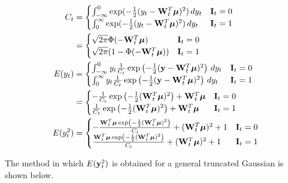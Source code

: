 \begin{appendices}
\begin{align}
\nonumber C_t&=\begin{cases}
\int_{-\infty}^{0}\exp(-\frac{1}{2}(y_t-\mathbf{W}_t^T{\boldsymbol{\mu}})^2)\,dy_t & \mathbf{I}_t=0\\
\int_{0}^{\infty}\exp(-\frac{1}{2}(y_t-\mathbf{W}_t^T{\boldsymbol{\mu}})^2)\,dy_t & \mathbf{I}_t=1\\
\end{cases}\\
&=\begin{cases}
\sqrt{2\pi}\Phi(-\mathbf{W}_t^T{\boldsymbol{\mu}}) & \mathbf{I}_t=0\\
\sqrt{2\pi}(1-\Phi(-\mathbf{W}_t^T{\boldsymbol{\mu}})) & \mathbf{I}_t=1\\
\end{cases}\\
\nonumber E(y_t)&=\begin{cases}
\int_{-\infty}^{0}y_t\frac{1}{C_t}\exp\left(-\frac{1}{2}(\mathbf{y}-\mathbf{W}_t^T{\boldsymbol{\mu}})^2\right)\,dy_t & \mathbf{I}_t=0\\
\int_{0}^{\infty}y_t\frac{1}{C_t}\exp\left(-\frac{1}{2}(\mathbf{y}-\mathbf{W}_t^T{\boldsymbol{\mu}})^2\right)\,dy_t & \mathbf{I}_t=1
\end{cases}\\
&=\begin{cases}
-\frac{1}{C_t}\exp\left(-\frac{1}{2}(\mathbf{W}_t^T{\boldsymbol{\mu}})^2\right)+\mathbf{W}_t^T{\boldsymbol{\mu}} & \mathbf{I}_t=0\\
\frac{1}{C_t}\exp\left(-\frac{1}{2}(\mathbf{W}_t^T{\boldsymbol{\mu}})^2\right)+\mathbf{W}_t^T{\boldsymbol{\mu}} & \mathbf{I}_t=1
\end{cases}\\
\nonumber E(y_t^2)&=\begin{cases}
-\frac{\mathbf{W}_t^T{\boldsymbol{\mu}}\exp\left(-\frac{1}{2}(\mathbf{W}_t^T{\boldsymbol{\mu}})^2\right)}{C_t}+(\mathbf{W}_t^T{\boldsymbol{\mu}})^2+1 & \mathbf{I}_t=0\\
\frac{\mathbf{W}_t^T{\boldsymbol{\mu}}\exp\left(-\frac{1}{2}(\mathbf{W}_t^T{\boldsymbol{\mu}})^2\right)}{C_t}+(\mathbf{W}_t^T{\boldsymbol{\mu}})^2+1 & \mathbf{I}_t=1
\end{cases}
\end{align}

The method in which $E(\mathbf{y}_t^2)$ is obtained for a general truncated Gaussian is shown below. 


\end{appendices}
